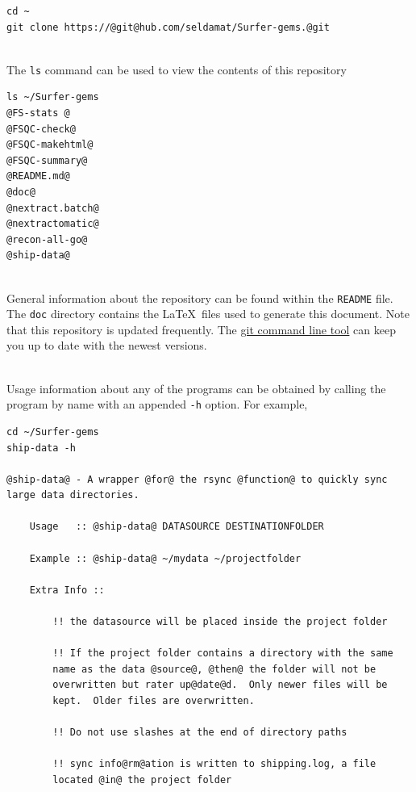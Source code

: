 \documentclass[paper=a4, fontsize=11pt]{scrartcl} %
\numberwithin{equation}{section} %
\numberwithin{figure}{section} %
\numberwithin{table}{section} %
\begin{document}
\begin{lstlisting}
cd ~
git clone https://@git@hub.com/seldamat/Surfer-gems.@git
\end{lstlisting}

~\\The \texttt{ls} command can be used to view the contents of this repository

\begin{lstlisting}
ls ~/Surfer-gems
@FS-stats @
@FSQC-check@
@FSQC-makehtml@
@FSQC-summary@
@README.md@
@doc@
@nextract.batch@
@nextractomatic@
@recon-all-go@
@ship-data@
\end{lstlisting}

~\\General information about the repository can be found within the \texttt{README} file.  The \texttt{doc} directory contains the \LaTeX\  files used to generate this document.  Note that this repository is updated frequently.  The \href{http://rogerdudler.github.io/git-guide/}{git command line tool} can keep you up to date with the newest versions.

~\\Usage information about any of the programs can be obtained by calling the program by name with an appended \texttt{-h} option.  For example,

\begin{lstlisting}
cd ~/Surfer-gems
ship-data -h

@ship-data@ - A wrapper @for@ the rsync @function@ to quickly sync large data directories.

	Usage   :: @ship-data@ DATASOURCE DESTINATIONFOLDER

	Example :: @ship-data@ ~/mydata ~/projectfolder

	Extra Info ::

		!! the datasource will be placed inside the project folder

		!! If the project folder contains a directory with the same
	   	name as the data @source@, @then@ the folder will not be
	   	overwritten but rater up@date@d.  Only newer files will be
	   	kept.  Older files are overwritten.

		!! Do not use slashes at the end of directory paths

		!! sync info@rm@ation is written to shipping.log, a file
		located @in@ the project folder
\end{lstlisting}
\end{document}
